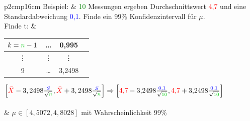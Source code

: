 		\begin{tabular}{p{2cm}p{16cm}}
        Beispiel: & \textcolor{green}{10} Messungen ergeben Durchschnittswert
        \textcolor{red}{4{,}7} und eine Standardabweichung \textcolor{blue}{0{,}1}.
        Finde ein 99\%  Konfidenzintervall für $\mu$.\\
        
         Finde t: & \begin{tabular}{| c | c | c | c |}
                   \hline
                   $k=\textcolor{green}{n}-1$ & \ldots & 0{,}995\\
                   \hline
                   \vdots & \vdots & \vdots \\
                   \hline
                   9 & \ldots & 3{,}2498\\
                   \hline
                   \end{tabular}
        
       		 $\left[\textcolor{red}{\bar{X}}-3,2498\frac{\textcolor{blue}{S}}{\sqrt{\textcolor{green}{n}}},
		\textcolor{red}{\bar{X}}+3,2498\frac{\textcolor{blue}{S}}{\sqrt{\textcolor{green}{n}}}\right]
		\Rightarrow 
		\left[{\color{red}4{,}7}-3{,}2498\frac{\textcolor{blue}{0{,}1}}{\sqrt{\textcolor{green}{10}}},
		\textcolor{red}{4{,}7}+3{,}2498\frac{\textcolor{blue}{0{,}1}}{\sqrt{\textcolor{green}{10}}}\right]$\\ \\
		& $\mu\in \left[4{,}5072, 4{,}8028\right]$ mit Wahrscheinlichkeit 99\%
        \end{tabular}